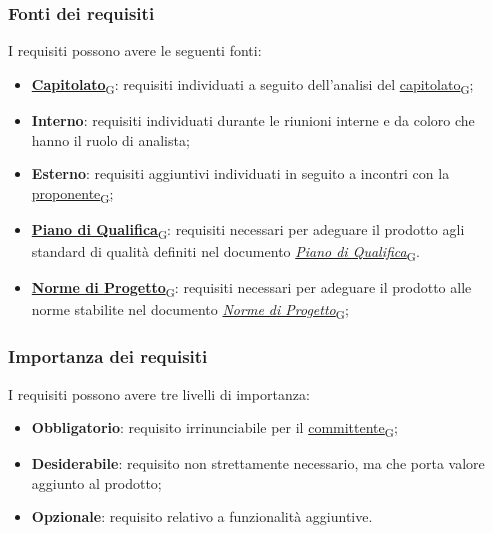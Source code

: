 \subsubsection{Fonti dei requisiti}
\label{sec:fonti_requisiti}
I requisiti possono avere le seguenti fonti:
\begin{itemize}
	\item \href{https://7last.github.io/docs/rtb/documentazione-interna/glossario\#capitolato}{\textbf{Capitolato}\textsubscript{G}}: requisiti individuati a seguito dell'analisi del \href{https://7last.github.io/docs/rtb/documentazione-interna/glossario\#capitolato}{capitolato\textsubscript{G}};
	\item \textbf{Interno}: requisiti individuati durante le riunioni interne e da coloro che hanno il ruolo di analista;
	\item \textbf{Esterno}: requisiti aggiuntivi individuati in seguito a incontri con la \href{https://7last.github.io/docs/rtb/documentazione-interna/glossario\#proponente}{proponente\textsubscript{G}};
	\item \href{https://7last.github.io/docs/rtb/documentazione-interna/glossario\#piano-di-qualifica}{\textbf{Piano di Qualifica}\textsubscript{G}}: requisiti necessari per adeguare il prodotto agli standard di qualità definiti nel documento \href{https://7last.github.io/docs/rtb/documentazione-interna/glossario\#piano-di-qualifica}{\textit{Piano di Qualifica}\textsubscript{G}}.
	\item \href{https://7last.github.io/docs/rtb/documentazione-interna/glossario\#norme-di-progetto}{\textbf{Norme di Progetto}\textsubscript{G}}: requisiti necessari per adeguare il prodotto alle norme stabilite nel documento \href{https://7last.github.io/docs/rtb/documentazione-interna/glossario\#norme-di-progetto}{\textit{Norme di Progetto}\textsubscript{G}};
\end{itemize}

\subsubsection{Importanza dei requisiti}
\label{sec:importanza_requisiti}
I requisiti possono avere tre livelli di importanza:
\begin{itemize}
	\item \textbf{Obbligatorio}: requisito irrinunciabile per il \href{https://7last.github.io/docs/rtb/documentazione-interna/glossario\#committente}{committente\textsubscript{G}};
	\item \textbf{Desiderabile}: requisito non strettamente necessario, ma che porta valore aggiunto al prodotto;
	\item \textbf{Opzionale}: requisito relativo a funzionalità aggiuntive.
\end{itemize}


